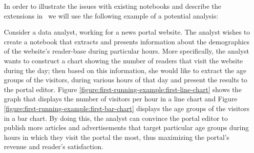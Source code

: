 In order to illustrate the issues with existing notebooks and describe the extensions in \projname\, we will use the following example of a potential analysis:

\begin{example}
Consider a data analyst, working for a news portal website. The analyst wishes to create a notebook that extracts and presents information about the demographics of the website's reader-base during particular hours. More specifically, the analyst wants to construct a chart showing the number of readers that visit the website during the day; then based on this information, she would like to extract the age groups of the visitors, during various hours of that day and present the results to the portal editor. Figure \ref{figure:first-running-example:first-line-chart} shows the graph that displays the number of visitors per hour in a line chart and Figure \ref{figure:first-running-example:first-bar-chart} displays the age groups of the visitors in a bar chart. By doing this, the analyst can convince the portal editor to publish more articles and advertisements that target particular age groups during hours in which they visit the portal the most, thus maximizing the portal's revenue and reader's satisfaction.
\end{example}




